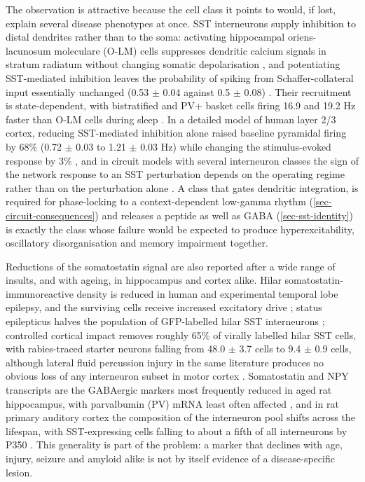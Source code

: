 \documentclass[11pt]{article}
\begin{document}
The observation is attractive because the cell class it points to would, if lost, explain several disease phenotypes at once. SST interneurons supply inhibition to distal dendrites rather than to the soma: activating hippocampal oriens-lacunosum moleculare (O-LM) cells suppresses dendritic calcium signals in stratum radiatum without changing somatic depolarisation \citep{Udakis2025}, and potentiating SST-mediated inhibition leaves the probability of spiking from Schaffer-collateral input essentially unchanged (0.53 $\pm$ 0.04 against 0.5 $\pm$ 0.08) \citep{Udakis2020}. Their recruitment is state-dependent, with bistratified and PV+ basket cells firing 16.9 and 19.2 Hz faster than O-LM cells during sleep \citep{Katona2014}. In a detailed model of human layer 2/3 cortex, reducing SST-mediated inhibition alone raised baseline pyramidal firing by 68\% (0.72 $\pm$ 0.03 to 1.21 $\pm$ 0.03 Hz) while changing the stimulus-evoked response by 3\% \citep{Yao2025}, and in circuit models with several interneuron classes the sign of the network response to an SST perturbation depends on the operating regime rather than on the perturbation alone \citep{Bos2025}. A class that gates dendritic integration, is required for phase-locking to a context-dependent low-gamma rhythm (\ref{sec-circuit-consequences}) and releases a peptide as well as GABA (\ref{sec-sst-identity}) is exactly the class whose failure would be expected to produce hyperexcitability, oscillatory disorganisation and memory impairment together.

Reductions of the somatostatin signal are also reported after a wide range of insults, and with ageing, in hippocampus and cortex alike. Hilar somatostatin-immunoreactive density is reduced in human and experimental temporal lobe epilepsy, and the surviving cells receive increased excitatory drive \citep{Halabisky2010}; status epilepticus halves the population of GFP-labelled hilar SST interneurons \citep{Buckmaster2011}; controlled cortical impact removes roughly 65\% of virally labelled hilar SST cells, with rabies-traced starter neurons falling from 48.0 $\pm$ 3.7 cells to 9.4 $\pm$ 0.9 cells, although lateral fluid percussion injury in the same literature produces no obvious loss of any interneuron subset in motor cortex \citep{Frankowski2022,Carron2019}. Somatostatin and NPY transcripts are the GABAergic markers most frequently reduced in aged rat hippocampus, with parvalbumin (PV) mRNA least often affected \citep{Vela2003}, and in rat primary auditory cortex the composition of the interneuron pool shifts across the lifespan, with SST-expressing cells falling to about a fifth of all interneurons by P350 \citep{Ouellet2014}. This generality is part of the problem: a marker that declines with age, injury, seizure and amyloid alike is not by itself evidence of a disease-specific lesion.
\end{document}
